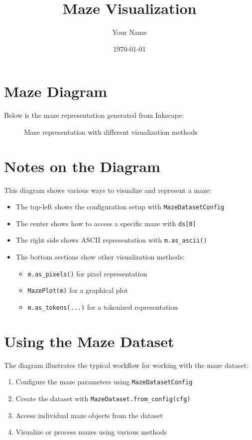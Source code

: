 \documentclass{article}
\title{Maze Visualization}
\author{Your Name}
\date{\today}
\begin{document}
\maketitle

\section{Maze Diagram}

Below is the maze representation generated from Inkscape:

\begin{figure}[h]
    \centering
    \def\svgwidth{0.8\textwidth}
    
    \caption{Maze representation with different visualization methods}
    \label{fig:maze}
\end{figure}

\section{Notes on the Diagram}

This diagram shows various ways to visualize and represent a maze:

\begin{itemize}
    \item The top-left shows the configuration setup with \texttt{MazeDatasetConfig}
    \item The center shows how to access a specific maze with \texttt{ds[0]}
    \item The right side shows ASCII representation with \texttt{m.as\_ascii()}
    \item The bottom sections show other visualization methods:
    \begin{itemize}
        \item \texttt{m.as\_pixels()} for pixel representation
        \item \texttt{MazePlot(m)} for a graphical plot
        \item \texttt{m.as\_tokens(...)} for a tokenized representation
    \end{itemize}
\end{itemize}

\section{Using the Maze Dataset}

The diagram illustrates the typical workflow for working with the maze dataset:

\begin{enumerate}
    \item Configure the maze parameters using \texttt{MazeDatasetConfig}
    \item Create the dataset with \texttt{MazeDataset.from\_config(cfg)}
    \item Access individual maze objects from the dataset
    \item Visualize or process mazes using various methods
\end{enumerate}
\end{document}
